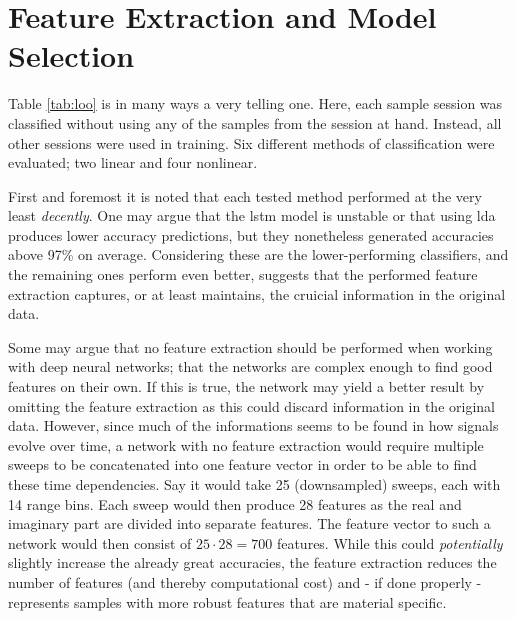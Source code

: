 






\section{Feature Extraction and Model Selection}
\label{disc_feat}
Table \ref{tab:loo} is in many ways a very telling one. Here, each sample session was classified without using any of the samples from the session at hand. Instead, all other sessions were used in training. Six different methods of classification were evaluated; two linear and four nonlinear. 

First and foremost it is noted that each tested method performed at the very least \emph{decently}. One may argue that the \gls{lstm} model is unstable or that using \gls{lda} produces lower accuracy predictions, but they nonetheless generated accuracies above 97\% on average. Considering these are the lower-performing classifiers, and the remaining ones perform even better, suggests that the performed feature extraction captures, or at least maintains, the cruicial information in the original data. 

Some may argue that no feature extraction should be performed when working with deep neural networks; that the networks are complex enough to find good features on their own. If this is true, the network may yield a better result by omitting the feature extraction as this could discard information in the original data. However, since much of the informations seems to be found in how signals evolve over time, a network with no feature extraction would require multiple sweeps to be concatenated into one feature vector in order to be able to find these time dependencies. Say it would take 25 (downsampled) sweeps, each with 14 range bins. Each sweep would then produce 28 features as the real and imaginary part are divided into separate features. The feature vector to such a network would then consist of $25\cdot 28=700$ features. While this could \textit{potentially} slightly increase the already great accuracies, the feature extraction reduces the number of features (and thereby computational cost) and - if done properly - represents samples with more robust features that are material specific.

